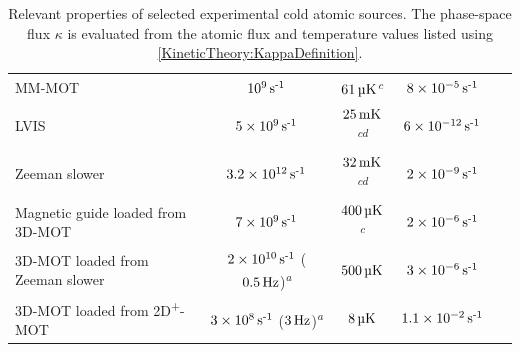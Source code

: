 \begin{table}
\begin{minipage}{\textwidth}
\begin{tabular}{ p{3.563cm} c c c r}
        MM-MOT & $\unit[10^9]{s\textsuperscript{-1}}$ & $\unit[61]{\micro K}$\textsuperscript{\emph{c}} & $\unit[8 \times 10^{-5}]{s\textsuperscript{-1}}$ &~\citep{Cren:2002rt}\\
        LVIS & $\unit[5\times 10^{9}]{s\textsuperscript{-1}}$ & $\unit[25]{mK}$\textsuperscript{\emph{cd}} & $\unit[6 \times 10^{-12}]{s\textsuperscript{-1}}$ &~\citep{Lu:1996} \\
        Zeeman slower & $\unit[3.2\times 10^{12}]{s\textsuperscript{-1}}$ & $\unit[32]{mK}$\textsuperscript{\emph{cd}} & $\unit[2\times10^{-9}]{s\textsuperscript{-1}}$ &~\citep{Slowe:2005} \\
        Magnetic guide loaded from 3D-MOT & $\unit[7\times 10^{9}]{s\textsuperscript{-1}}$ & $\unit[400]{\micro K}$\textsuperscript{\emph{c}} & $\unit[2\times 10^{-6}]{s\textsuperscript{-1}}$ &~\citep{Lahaye:2004}\\
        3D-MOT loaded from Zeeman slower & $\unit[2\times 10^{10}]{s\textsuperscript{-1}}$ ($\unit[0.5]{Hz}$)\textsuperscript{\emph{a}} & $\unit[500]{\micro K}$ & $\unit[3\times 10^{-6}]{s\textsuperscript{-1}}$ &~\citep{Streed:2006}\\
        3D-MOT loaded from 2D\textsuperscript{+}-MOT & $\unit[3\times 10^8]{s\textsuperscript{-1}}$ ($\unit[3]{Hz}$)\textsuperscript{\emph{a}} & $\unit[8]{\micro K}$ & $\unit[1.1\times 10^{-2}]{s\textsuperscript{-1}}$ &~\citep{Muller:2007}\\
        \bottomrule
        \end{tabular}
    \end{minipage}
    \caption{Relevant properties of selected experimental cold atomic sources. The phase-space flux $\kappa$ is evaluated from the atomic flux and temperature values listed using \eqref{KineticTheory:KappaDefinition}.}
    \label{KineticTheory:ExperimentalSources}
\end{table}


